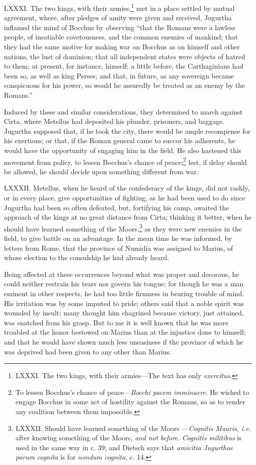 LXXXI. The two kings, with their armies,\footnote{LXXXI. The two kings, with their armies—The text has only
\emph{exercitus}.} met in a place settled
by mutual agreement, where, after pledges of amity were given and
received, Jugurtha inflamed the mind of Bocchus by observing ``that the
Romans were a lawless people, of insatiable covetousness, and the
common enemies of mankind; that they had the same motive for making
war on Bocchus as on himself and other nations, the lust of dominion;
that all independent states were objects of hatred to them; at present,
for instance, himself; a little before, the Carthaginians had been so,
as well as king Perses; and that, in future, as any sovereign became
conspicuous for his power, so would he assuredly be treated as an enemy
by the Romans.''

Induced by these and similar considerations, they determined to march
against Cirta, where Metellus had deposited his plunder, prisoners,
and baggage. Jugurtha supposed that, if he took the city, there would
be ample recompense for his exertions; or that, if the Roman general
came to succor his adherents, he would have the opportunity of
engaging him in the field. He also hastened this movement from policy,
to lessen Bocchus's chance of peace;\footnote{To lessen Bocchus's chance of peace—\emph{Bocchi pacem
imminuere}. He wished to engage Bocchus in some act of hostility
against the Romans, so as to render any coalition between them
impossible.} lest, if delay should be
allowed, he should decide upon something different from war.

LXXXII. Metellus, when he heard of the confederacy of the kings, did
not rashly, or in every place, give opportunities of fighting, as he
had been used to do since Jugurtha had been so often defeated, but,
fortifying his camp, awaited the approach of the kings at no great
distance from Cirta; thinking it better, when he should have learned
something of the Moors,\footnote{LXXXII. Should have learned something of the Moors
—\emph{Cognitis Mauris, i.e.} after knowing something of the Moors,
\emph{and not before}. \emph{Cognitis militibus} is used in the same way in c.
39; and Dietsch says that \emph{amicitia Jugurthae parum cognita} is for
\emph{nondum cognita}, c. 14.} as they were new enemies in the field,
to give battle on an advantage. In the mean time he was informed, by
letters from Rome, that the province of Numidia was assigned to Marius,
of whose election to the consulship he had already heard.

Being affected at these occurrences beyond what was proper and
decorous, he could neither restrain his tears nor govern his tongue;
for though he was a man eminent in other respects, he had too little
firmness in bearing trouble of mind. His irritation was by some
imputed to pride; others said that a noble spirit was wounded by
insult; many thought him chagrined because victory, just attained, was
snatched from his grasp. But to me it is well known that he was more
troubled at the honor bestowed on Marius than at the injustice done to
himself; and that he would have shown much less uneasiness if the
province of which he was deprived had been given to any other than
Marius.

